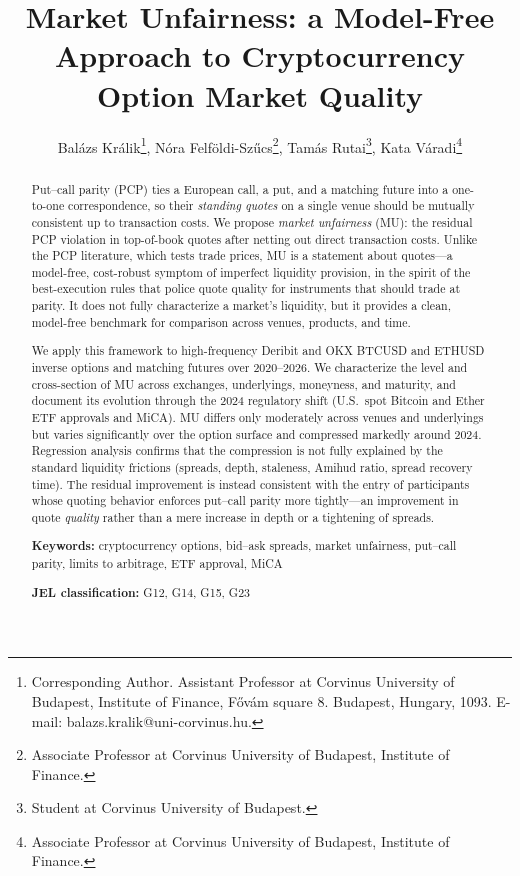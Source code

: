 \documentclass[12pt]{article}
\begin{document}
\title{\textbf{Market Unfairness: a Model-Free Approach to Cryptocurrency Option Market Quality}}

\author{Bal\'azs Kr\'alik\thanks{Corresponding Author. Assistant Professor at Corvinus University of Budapest, Institute of Finance, F\H{o}v\'am square 8. Budapest, Hungary, 1093. E-mail: balazs.kralik@uni-corvinus.hu.}, N\'ora Felf\"oldi-Sz\H{u}cs\thanks{Associate Professor at Corvinus University of Budapest, Institute of Finance.}, Tam\'as Rutai\thanks{Student at Corvinus University of Budapest.}, Kata V\'aradi\thanks{Associate Professor at Corvinus University of Budapest, Institute of Finance.}}
\date{}
\maketitle

\begin{abstract}
Put--call parity (PCP) ties a European call, a put, and a matching future into a one-to-one correspondence, so their \emph{standing quotes} on a single venue should be mutually consistent up to transaction costs. We propose \emph{market unfairness} (MU): the residual PCP violation in top-of-book quotes after netting out direct transaction costs. Unlike the PCP literature, which tests trade prices, MU is a statement about quotes---a model-free, cost-robust symptom of imperfect liquidity provision, in the spirit of the best-execution rules that police quote quality for instruments that should trade at parity. It does not fully characterize a market's liquidity, but it provides a clean, model-free benchmark for comparison across venues, products, and time.

We apply this framework to high-frequency Deribit and OKX BTCUSD and ETHUSD inverse options and matching futures over 2020--2026. We characterize the level and cross-section of MU across exchanges, underlyings, moneyness, and maturity, and document its evolution through the 2024 regulatory shift (U.S.\ spot Bitcoin and Ether ETF approvals and MiCA). MU differs only moderately across venues and underlyings but varies significantly over the option surface and compressed markedly around 2024. Regression analysis confirms that the compression is not fully explained by the standard liquidity frictions (spreads, depth, staleness, Amihud ratio, spread recovery time). The residual improvement is instead consistent with the entry of participants whose quoting behavior enforces put--call parity more tightly---an improvement in quote \emph{quality} rather than a mere increase in depth or a tightening of spreads.

\medskip
\textbf{Keywords:} cryptocurrency options, bid--ask spreads, market unfairness, put--call parity, limits to arbitrage, ETF approval, MiCA

\medskip
\textbf{JEL classification:} G12, G14, G15, G23
\end{abstract}
\end{document}
